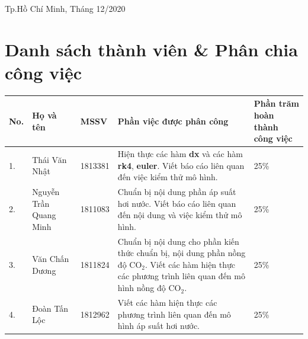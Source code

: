 \documentclass[a4paper]{article}
\begin{document}
\begin{titlepage}
\begin{table}[h]
\begin{tabular}{>{}r >{}r >{}l}
\end{tabular}

\end{table}

\vspace{1cm}

\begin{center}
{\footnotesize Tp.Hồ Chí Minh, Tháng 12/2020}
\end{center}
\end{titlepage}


\newpage
\tableofcontents
\newpage


\section*{Danh sách thành viên \& Phân chia công việc}
\begin{table}[H]
\begin{tabular}{lll p{} p{}}
\hline
No. & Họ và tên              & MSSV    & Phần việc được phân công                                                                                                                                                      & Phần trăm hoàn thành công việc \\ \hline
1.  & Thái Văn Nhật          & 1813381 & Hiện thực các hàm \textbf{dx} và các hàm \textbf{rk4}, \textbf{euler}. Viết báo cáo liên quan đến việc kiểm thử mô hình.                                                    & 25\%                           \\
2.  & Nguyễn Trần Quang Minh & 1811083 & Chuẩn bị nội dung phần áp suất hơi nước. Viết báo cáo liên quan đến nội dung và việc kiểm thử mô hình.                                                                         & 25\%                           \\
3.  & Văn Chấn Dương         & 1811824 & Chuẩn bị nội dung cho phần kiến thức chuẩn bị, nội dung phần nồng độ $\mathrm{CO_2}$.  Viết các hàm hiện thực các phương trình liên quan đến mô hình nồng độ $\mathrm{CO_2}$. & 25\%                           \\
4.  & Đoàn Tấn Lộc           & 1812962 & Viết các hàm hiện thực các phương trình liên quan đến mô hình áp suất hơi nước.                                                                                               & 25\%                           \\ \hline
\end{tabular}
\end{table}
\end{document}
